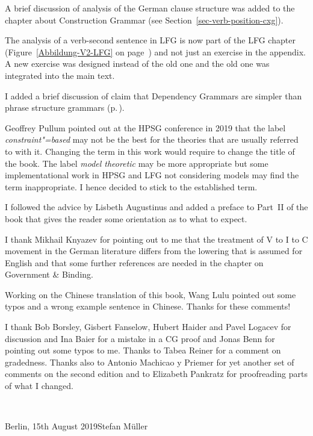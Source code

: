 A brief discussion of  analysis of the German clause structure was added to the
chapter about Construction Grammar (see Section~\ref{sec-verb-position-cxg}).

The analysis of a verb-second sentence in LFG is now part of the LFG chapter
(Figure~\ref{Abbildung-V2-LFG} on page~\pageref{Abbildung-V2-LFG}) and not just an
exercise in the appendix. A new exercise was designed instead of the old one and the old one was
integrated into the main text.

I added a brief discussion of  claim that Dependency Grammars are simpler than
phrase structure grammars (p.\,\pageref{page-simplicity-dg}).

Geoffrey Pullum pointed out at the HPSG conference in 2019 that the label \emph{constraint"=based}
may not be the best for the theories that are usually referred to with it. Changing the term in
this work would require to change the title of the book. The label \emph{model theoretic} may be
more appropriate but some implementational work in HPSG and LFG not considering models may find the
term inappropriate. I hence decided to stick to the established term.

I followed the advice by Lisbeth Augustinus and added a preface to Part~II of the book that gives
the reader some orientation as to what to expect.

I thank Mikhail Knyazev for pointing out to me that the treatment of V to I to C movement in the
German literature differs from the lowering that is assumed for English and that some further
references are needed in the chapter on Government \& Binding. 

Working on the Chinese translation of this book, Wang Lulu pointed out some
typos and a wrong example sentence in Chinese. Thanks for these comments! 

I thank Bob Borsley, Gisbert Fanselow, Hubert Haider and Pavel Logacev for discussion and Ina Baier for a mistake
in a CG proof and Jonas Benn for pointing out some typos to me. Thanks to Tabea Reiner for a comment
on gradedness. Thanks also to Antonio Machicao y Priemer for yet another set of comments on the
second edition and to Elizabeth Pankratz for proofreading parts of what I changed.

~\medskip

\noindent
Berlin, 15th August 2019\hfill Stefan Müller



